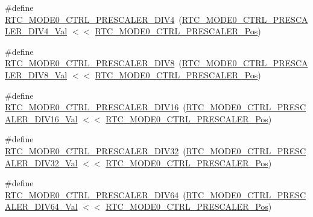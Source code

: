 \begin{DoxyCompactItemize}
\item 
\#define \mbox{\hyperlink{group___s_a_m_d21___r_t_c_ga4dc50c00b09d0628eedf0e5f0adf8ffe}{R\+T\+C\+\_\+\+M\+O\+D\+E0\+\_\+\+C\+T\+R\+L\+\_\+\+P\+R\+E\+S\+C\+A\+L\+E\+R\+\_\+\+D\+I\+V4}}~(\mbox{\hyperlink{group___s_a_m_d21___r_t_c_ga23ddb56c7b7ab407e943449a261d904b}{R\+T\+C\+\_\+\+M\+O\+D\+E0\+\_\+\+C\+T\+R\+L\+\_\+\+P\+R\+E\+S\+C\+A\+L\+E\+R\+\_\+\+D\+I\+V4\+\_\+\+Val}} $<$$<$ \mbox{\hyperlink{group___s_a_m_d21___r_t_c_gae6a98daefadfa386b8f37022a707044e}{R\+T\+C\+\_\+\+M\+O\+D\+E0\+\_\+\+C\+T\+R\+L\+\_\+\+P\+R\+E\+S\+C\+A\+L\+E\+R\+\_\+\+Pos}})
\item 
\#define \mbox{\hyperlink{group___s_a_m_d21___r_t_c_gaefabb949ec54334a13a1f1f9caef5dfd}{R\+T\+C\+\_\+\+M\+O\+D\+E0\+\_\+\+C\+T\+R\+L\+\_\+\+P\+R\+E\+S\+C\+A\+L\+E\+R\+\_\+\+D\+I\+V8}}~(\mbox{\hyperlink{group___s_a_m_d21___r_t_c_ga3e6065672e5618bb55ed1e518a71577a}{R\+T\+C\+\_\+\+M\+O\+D\+E0\+\_\+\+C\+T\+R\+L\+\_\+\+P\+R\+E\+S\+C\+A\+L\+E\+R\+\_\+\+D\+I\+V8\+\_\+\+Val}} $<$$<$ \mbox{\hyperlink{group___s_a_m_d21___r_t_c_gae6a98daefadfa386b8f37022a707044e}{R\+T\+C\+\_\+\+M\+O\+D\+E0\+\_\+\+C\+T\+R\+L\+\_\+\+P\+R\+E\+S\+C\+A\+L\+E\+R\+\_\+\+Pos}})
\item 
\#define \mbox{\hyperlink{group___s_a_m_d21___r_t_c_gad39f24555f010d8e0b54c2d30b848065}{R\+T\+C\+\_\+\+M\+O\+D\+E0\+\_\+\+C\+T\+R\+L\+\_\+\+P\+R\+E\+S\+C\+A\+L\+E\+R\+\_\+\+D\+I\+V16}}~(\mbox{\hyperlink{group___s_a_m_d21___r_t_c_ga9f98053993e1fdd52f993797089d7ee9}{R\+T\+C\+\_\+\+M\+O\+D\+E0\+\_\+\+C\+T\+R\+L\+\_\+\+P\+R\+E\+S\+C\+A\+L\+E\+R\+\_\+\+D\+I\+V16\+\_\+\+Val}} $<$$<$ \mbox{\hyperlink{group___s_a_m_d21___r_t_c_gae6a98daefadfa386b8f37022a707044e}{R\+T\+C\+\_\+\+M\+O\+D\+E0\+\_\+\+C\+T\+R\+L\+\_\+\+P\+R\+E\+S\+C\+A\+L\+E\+R\+\_\+\+Pos}})
\item 
\#define \mbox{\hyperlink{group___s_a_m_d21___r_t_c_ga2496e893087e3bcea310c601e1b961f2}{R\+T\+C\+\_\+\+M\+O\+D\+E0\+\_\+\+C\+T\+R\+L\+\_\+\+P\+R\+E\+S\+C\+A\+L\+E\+R\+\_\+\+D\+I\+V32}}~(\mbox{\hyperlink{group___s_a_m_d21___r_t_c_gac81bb264f0a2d7bd0a6e2801f0cc3b98}{R\+T\+C\+\_\+\+M\+O\+D\+E0\+\_\+\+C\+T\+R\+L\+\_\+\+P\+R\+E\+S\+C\+A\+L\+E\+R\+\_\+\+D\+I\+V32\+\_\+\+Val}} $<$$<$ \mbox{\hyperlink{group___s_a_m_d21___r_t_c_gae6a98daefadfa386b8f37022a707044e}{R\+T\+C\+\_\+\+M\+O\+D\+E0\+\_\+\+C\+T\+R\+L\+\_\+\+P\+R\+E\+S\+C\+A\+L\+E\+R\+\_\+\+Pos}})
\item 
\#define \mbox{\hyperlink{group___s_a_m_d21___r_t_c_gad18c0ccaed4db0fb0fb3fd46512e7558}{R\+T\+C\+\_\+\+M\+O\+D\+E0\+\_\+\+C\+T\+R\+L\+\_\+\+P\+R\+E\+S\+C\+A\+L\+E\+R\+\_\+\+D\+I\+V64}}~(\mbox{\hyperlink{group___s_a_m_d21___r_t_c_gac0fc48bdfa32e15f293b0d6b2969b210}{R\+T\+C\+\_\+\+M\+O\+D\+E0\+\_\+\+C\+T\+R\+L\+\_\+\+P\+R\+E\+S\+C\+A\+L\+E\+R\+\_\+\+D\+I\+V64\+\_\+\+Val}} $<$$<$ \mbox{\hyperlink{group___s_a_m_d21___r_t_c_gae6a98daefadfa386b8f37022a707044e}{R\+T\+C\+\_\+\+M\+O\+D\+E0\+\_\+\+C\+T\+R\+L\+\_\+\+P\+R\+E\+S\+C\+A\+L\+E\+R\+\_\+\+Pos}})
$$
\end{DoxyCompactItemize}
